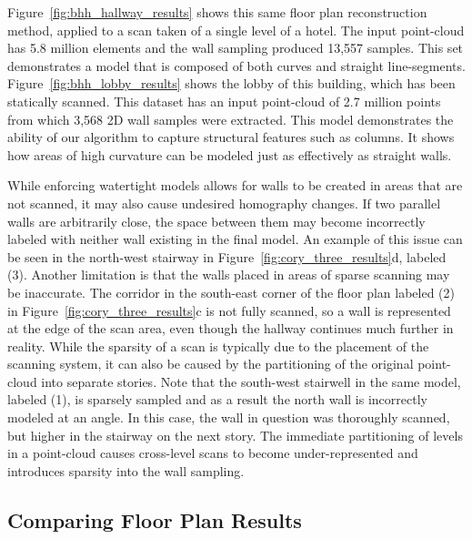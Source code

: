 \documentclass[12pt,onecolumn,oneside]{book}
\begin{document}
Figure~\ref{fig:bhh_hallway_results} shows this same floor plan reconstruction method, applied to a scan taken of a single level of a hotel.  The input point-cloud has 5.8 million elements and the wall sampling produced 13,557 samples.  This set demonstrates a model that is composed of both curves and straight line-segments. Figure~\ref{fig:bhh_lobby_results} shows the lobby of this building, which has been statically scanned.  This dataset has an input point-cloud of 2.7 million points from which 3,568 2D wall samples were extracted. This model demonstrates the ability of our algorithm to capture structural features such as columns.  It shows how areas of high curvature can be modeled just as effectively as straight walls.

While enforcing watertight models allows for walls to be created in areas that are not scanned, it may also cause undesired homography changes.  If two parallel walls are arbitrarily close, the space between them may become incorrectly labeled with neither wall existing in the final model.  An example of this issue can be seen in the north-west stairway in Figure~\ref{fig:cory_three_results}d, labeled (3).  Another limitation is that the walls placed in areas of sparse scanning may be inaccurate.  The corridor in the south-east corner of the floor plan labeled (2) in Figure~\ref{fig:cory_three_results}c is not fully scanned, so a wall is represented at the edge of the scan area, even though the hallway continues much further in reality.  While the sparsity of a scan is typically due to the placement of the scanning system, it can also be caused by the partitioning of the original point-cloud into separate stories.  Note that the south-west stairwell in the same model, labeled (1), is sparsely sampled and as a result the north wall is incorrectly modeled at an angle.  In this case, the wall in question was thoroughly scanned, but higher in the stairway on the next story.  The immediate partitioning of levels in a point-cloud causes cross-level scans to become under-represented and introduces sparsity into the wall sampling.

\subsection{Comparing Floor Plan Results}
\label{ssec:fp_results_compare}
\end{document}
